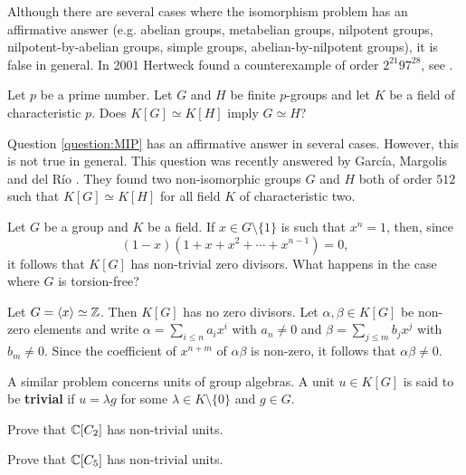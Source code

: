 Although there are several cases where 
the isomorphism problem has an affirmative answer (e.g. abelian groups, 
metabelian groups, nilpotent groups, nilpotent-by-abelian groups, simple groups, 
abelian-by-nilpotent groups), it is false in general. In 2001  
Hertweck found a counterexample of order $2^{21}97^{28}$, see \cite{MR1847590}.  

\begin{question}
\label{question:MIP}
    Let $p$ be a prime number. Let 
    $G$ and $H$ be finite $p$-groups and let $K$ be a field of characteristic $p$. 
    Does $K[G]\simeq K[H]$ imply $G\simeq H$?
\end{question}   

Question \ref{question:MIP} has an affirmative answer in several cases. However, 
this is not true in general. This question was recently answered by Garc\'ia, Margolis and
del R\'io \cite{MR4373245}. They found two non-isomorphic groups $G$ and $H$ both of order $512$ 
such that $K[G]\simeq K[H]$ for all field $K$ 
of characteristic two. 


Let $G$ be a group and $K$ be a field. If  
$x\in G\setminus\{1\}$ is such that $x^n=1$, then, since 
\[
(1-x)(1+x+x^2+\cdots+x^{n-1})=0, 
\] 
it follows that $K[G]$ has non-trivial zero divisors. What happens in the case
where $G$ is torsion-free?

\begin{example}
	\label{example:k[Z]}
	Let $G=\langle x\rangle\simeq\mathbb{Z}$. Then $K[G]$ has no zero divisors. 
	Let $\alpha,\beta\in K[G]$ be non-zero elements and write 
	$\alpha=\sum_{i\leq n}a_ix^i$ with $a_n\ne 0$ and $\beta=\sum_{j\leq m}b_jx^j$
	with $b_m\ne 0$. Since the coefficient of $x^{n+m}$ of $\alpha\beta$ is non-zero,
	it follows that 
	$\alpha\beta\ne 0$.
\end{example}

A similar problem concerns units of group algebras.  A unit $u\in K[G]$ is said
to be \textbf{trivial} if $u=\lambda g$ for some $\lambda\in K\setminus\{0\}$ and
$g\in G$.	

\begin{exercise}
\label{xca:non_trivial:C2}
	Prove that $\mathbb{C}[C_2]$ has non-trivial units.
\end{exercise}

\begin{exercise}
\label{xca:non_trivial:C5}
	Prove that $\mathbb{C}[C_5]$ has non-trivial units. 
\end{exercise}

